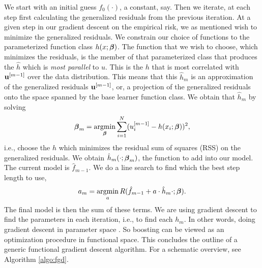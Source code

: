 We start with an initial guess $f_0(\cdot)$, a constant, say. Then we iterate, at each step first calculating the generalized residuals from the previous iteration. At a given step in our gradient descent on the empirical risk, we as mentioned wish to minimize the generalized residuals. We constrain our choice of functions to the parameterized function class $h(x;\boldsymbol{\beta})$. The function that we wish to choose, which minimizes the residuals, is the member of that parameterized class that produces the $\hat{h}$ which is \textit{most parallel} to $u$. This is the $h$ that is most correlated with $\mathbf{u}^{[m-1]}$ over the data distribution. This means that this $\hat{h}_m$ is an approximation of the generalized residuals $\mathbf{u}^{[m-1]}$, or, a projection of the generalized residuals onto the space spanned by the base learner function class. We obtain that $\hat{h}_m$ by solving
\begin{equation}
    \boldsymbol{\beta}_m=\operatorname*{argmin}_{\boldsymbol{\beta}} \sum_{i=1}^N (u_i^{[m-1]}-h(x_i;\boldsymbol{\beta}))^2,
\end{equation}
i.e., choose the $h$ which minimizes the residual sum of squares (RSS) on the generalized residuals. We obtain $\hat{h}_m(\cdot;\boldsymbol{\beta}_m)$, the function to add into our model. The current model is $\hat{f}_{m-1}$. We do a line search to find which the best step length to use,
\begin{equation*}
    a_m=\operatorname*{argmin}_{a}R(\hat{f}_{m-1}+a\cdot\hat{h}_m{\cdot;\boldsymbol{\beta}}).
\end{equation*}
The final model is then the sum of these terms. We are using gradient descent to find the parameters in each iteration, i.e., to find each $h_m$. In other words, doing gradient descent in parameter space \citep{friedman2001}. So boosting can be viewed as an optimization procedure in functional space. This concludes the outline of a generic functional gradient descent algorithm. For a schematic overview, see Algorithm \ref{algo:fgd}.
